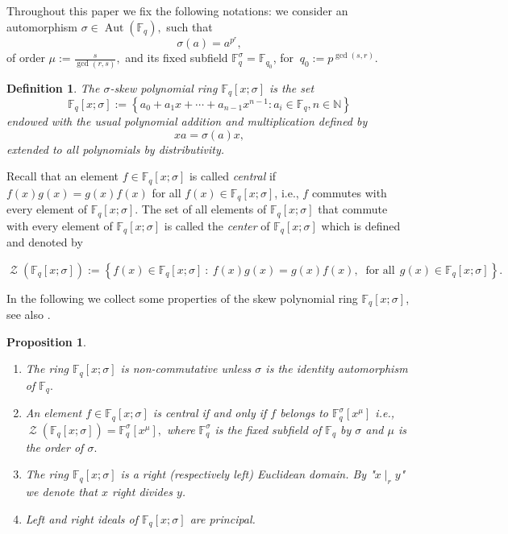 \documentclass[12pt,paper]{article}
\theoremstyle{plain}
\newtheorem{proposition}[theorem]{Proposition}
\newtheorem{definition}[theorem]{Definition}
\newcommand{\Fq}{\mathbb{F}_{q}}
\DeclareMathOperator{\Z}{\mathcal{Z}}
\DeclareMathOperator{\aut}{Aut}
\begin{document}
 Throughout  this paper we fix the following notations: we consider an automorphism  $\sigma \in \aut(\Fq),$ such that $$\sigma(a)=a^{p^r},$$ of order $ \mu:=\frac{s}{\gcd(r,s)},$ and its fixed subfield $\Fq^{\sigma}=\mathbb{F}_{q_0}$, for $\ q_0:=p^{\gcd(s,r)}.$   
 

\begin{definition}
The \emph{$\sigma$-skew polynomial ring} $\Fq [x;\sigma]$ is the set 
$$ \Fq [x;\sigma]:=\left\{a_{0}+a_{1} x+\cdots+a_{n-1} x^{n-1}: a_{i} \in \Fq, n \in \mathbb{N}\right\}$$
endowed with  the usual polynomial addition and   multiplication defined by 
$$ xa=  \sigma(a) x ,$$
extended to all polynomials by distributivity. 
\end{definition}

Recall that an element $f\in \Fq[x;\sigma]$ is called   \emph{central} if $f(x) g(x) = g(x) f(x)$ for all $f(x) \in \Fq[x;\sigma]$, i.e., $f$ commutes with every element of $\Fq[x;\sigma]$. The set of all elements of $\Fq[x;\sigma]$ that commute with every element of $\Fq[x;\sigma]$ is called the  \emph{center} of $\Fq[x;\sigma]$ which is defined and  denoted by
\begin{center}
 $ \Z(\Fq[x;\sigma]):=\left\lbrace f(x) \in \Fq[x;\sigma] \ : \  f(x) g(x) = g(x) f(x), \ \text{ for all} \ \ g(x) \in \Fq[x;\sigma] \right\rbrace .$
\end{center}


In the following we collect some properties of  the  skew polynomial ring $\Fq[x;\sigma]$, see also \cite[p. 483-486]{Ore33}.

\begin{proposition} \label{PPP.1}
\begin{enumerate}
\item The ring $\Fq[x;\sigma]$  is non-commutative unless $\sigma $ is the identity automorphism of $\Fq.$ 
\item   An element $f \in \Fq[x;\sigma]$ is central if and only if $f$ belongs to $ \Fq^{\sigma}[x^{\mu}]$ i.e., $  \Z(\Fq[x;\sigma])= \Fq^{\sigma}[x^{\mu}],$ where  $ \Fq^{\sigma}$ is the fixed subfield of $\Fq$ by $\sigma$ and $\mu$ is the order  of $\sigma.$
\item The ring $\Fq[x;\sigma]$ is a right (respectively left)   Euclidean domain. By  "$x \mid_r y$"   we denote that $x$ right divides $y$.
\item Left and right ideals of $\Fq[x;\sigma]$ are principal.
\end{enumerate}
\end{proposition}
\end{document}
